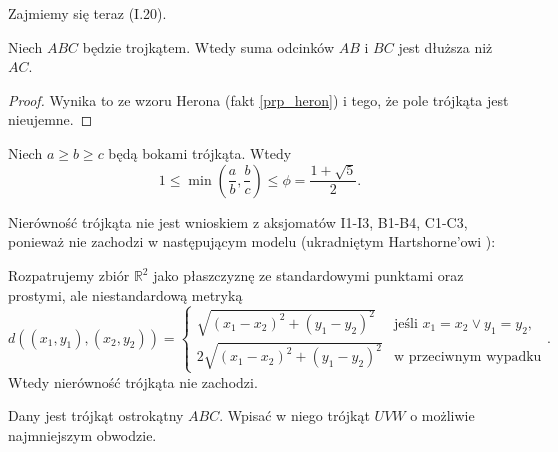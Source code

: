 %

Zajmiemy się teraz (I.20).

\begin{proposition}
%
	Niech $ABC$ będzie trojkątem.
	Wtedy suma odcinków $AB$ i $BC$ jest dłuższa niż $AC$.
\end{proposition}

\begin{proof}
	Wynika to ze wzoru Herona (fakt \ref{prp_heron}) i tego, że pole trójkąta jest nieujemne.
\end{proof}

\begin{corollary}
	Niech $a \ge b \ge c$ będą bokami trójkąta.
	Wtedy
	\begin{equation}
		1 \le \min \left(\frac ab, \frac bc\right) \le \phi = \frac {1 + \sqrt 5}{2}.
	\end{equation}
\end{corollary}

Nierówność trójkąta nie jest wnioskiem z aksjomatów I1-I3, B1-B4, C1-C3, ponieważ nie zachodzi w następującym modelu (ukradniętym Hartshorne'owi \cite[s. 90]{hartshorne2000}):

\begin{example}
	Rozpatrujemy zbiór $\mathbb R^2$ jako płaszczyznę ze standardowymi punktami oraz prostymi, ale niestandardową metryką
	\begin{equation}
		d((x_1, y_1), (x_2, y_2)) = \begin{cases}
			\sqrt{(x_1-x_2)^2 + (y_1-y_2)^2} & \text{jeśli } x_1 = x_2 \vee y_1 = y_2, \\
			2 \sqrt{(x_1-x_2)^2 + (y_1-y_2)^2} & \text{w przeciwnym wypadku}
		\end{cases}.
	\end{equation}
	Wtedy nierówność trójkąta nie zachodzi.
\end{example}


\begin{problem}
	Dany jest trójkąt ostrokątny $ABC$.
	Wpisać w niego trójkąt $UVW$ o możliwie najmniejszym obwodzie.
%
\end{problem}

